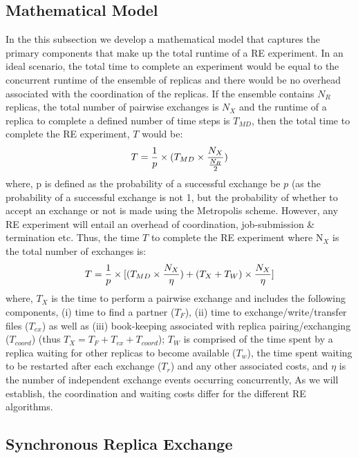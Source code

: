 \documentclass{rspublic}
\newcommand{\alnote}[1]{ {\textcolor{blue} { ***andre: #1 }}}
\newcommand{\alnote}[1]{}
\begin{document}
\subsection{Mathematical Model}

In the this subsection we develop a mathematical model that captures
the primary components that make up the total runtime of a RE
experiment. In an ideal scenario, the total time to complete an
experiment would be equal to the concurrent runtime of the ensemble of
replicas and there would be no overhead associated with the
coordination of the replicas.  If the ensemble contains $N_R$
replicas, the total number of pairwise exchanges is $N_X$ and the
runtime of a replica to complete a defined number of time steps is
$T_{MD}$, then the total time to complete the RE experiment, $T$ would
be:
\begin{eqnarray}
T = {1\over p} \times (T_{MD} \times  {N_X \over {N_R \over 2}}) 
\label{eq:totaltime}
\end{eqnarray}
where, p is defined as the probability of a successful exchange be $p$
(as the probability of a successful exchange is not 1, but the
probability of whether to accept an exchange or not is made using the
Metropolis scheme.  However, any RE experiment will entail an overhead
of coordination, job-submission \& termination etc. Thus, the time $T$
to complete the RE experiment where N$_X$ is the total number of
exchanges is:
\begin{eqnarray}
  T = {1\over p} \times [(T_{MD} \times  {N_X \over {\eta}}) +
  {(T_{X} + T_{W})} \times {N_X \over \eta}]
\label{eq:totaltime}
\end{eqnarray}
where, $T_{X}$ is the time to perform a pairwise exchange and includes
the following components, (i) time to find a partner ($T_F$), (ii)
time to exchange/write/transfer files ($T_{ex}$) as well as (iii)
book-keeping associated with replica pairing/exchanging ($T_{coord}$)
(thus $T_{X} = T_{F} + T_{ex}+T_{coord}$); 
$T_W$ is comprised of the time spent by a replica waiting for other
replicas to become available ($T_w$), the time spent waiting to be restarted
after each exchange ($T_r$) and any other associated costs, and $\eta$
is the number of independent exchange events occurring concurrently,
As we will establish, the coordination and waiting costs differ for
the different RE algorithms.

\subsection{Synchronous Replica Exchange}
\end{document}

